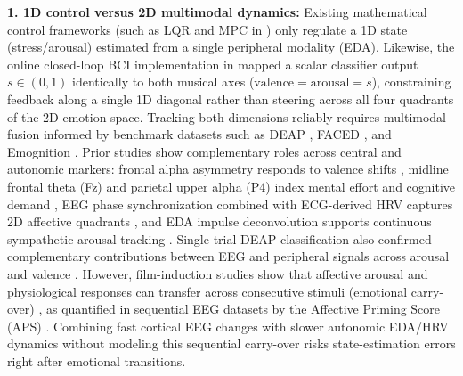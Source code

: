 \documentclass[a4paper,fleqn]{cas-dc}
\begin{document}
\textbf{1. 1D control versus 2D multimodal dynamics:} Existing mathematical control frameworks (such as LQR and MPC in \cite{azgomi2022enhancement}) only regulate a 1D state (stress/arousal) estimated from a single peripheral modality (EDA). Likewise, the online closed-loop BCI implementation in \cite{ehrlich2019closed} mapped a scalar classifier output $s \in (0,1)$ identically to both musical axes ($\text{valence} = \text{arousal} = s$), constraining feedback along a single 1D diagonal rather than steering across all four quadrants of the 2D emotion space. Tracking both dimensions reliably requires multimodal fusion informed by benchmark datasets such as DEAP \cite{koelstra2012deap}, FACED \cite{chen2023large}, and Emognition \cite{saganowski2022emognition}. Prior studies show complementary roles across central and autonomic markers: frontal alpha asymmetry responds to valence shifts \cite{ramirez2015musical,koelstra2012deap}, midline frontal theta (Fz) and parietal upper alpha (P4) index mental effort and cognitive demand \cite{ewing2016evaluation}, EEG phase synchronization combined with ECG-derived HRV captures 2D affective quadrants \cite{marin2018affective}, and EDA impulse deconvolution supports continuous sympathetic arousal tracking \cite{khazaei2024bayesian}. Single-trial DEAP classification also confirmed complementary contributions between EEG and peripheral signals across arousal and valence \cite{koelstra2012deap}. However, film-induction studies show that affective arousal and physiological responses can transfer across consecutive stimuli (emotional carry-over) \cite{gross1995emotion,fernandez2019effective}, as quantified in sequential EEG datasets by the Affective Priming Score (APS) \cite{gutierrez2025affective}. Combining fast cortical EEG changes with slower autonomic EDA/HRV dynamics without modeling this sequential carry-over risks state-estimation errors right after emotional transitions.
\end{document}

